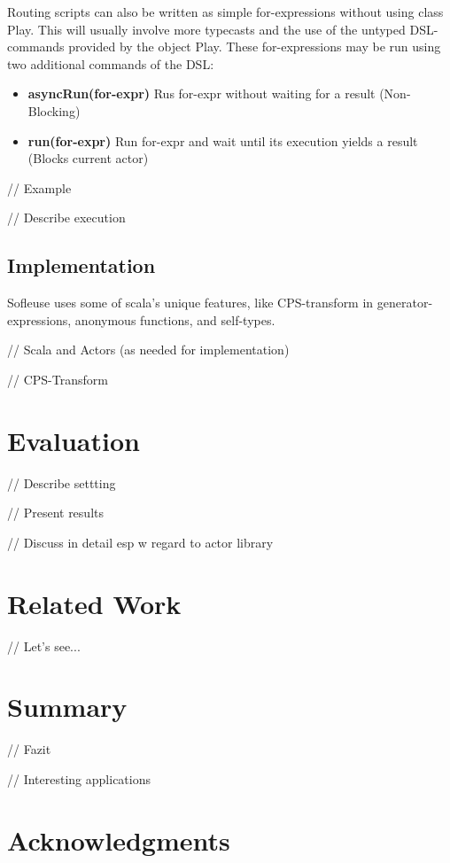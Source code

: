 \documentclass{sig-alternate}
\begin{document}
Routing scripts can also be written as simple for-expressions without using class Play.  This will
usually involve more typecasts and the use of the untyped DSL-commands provided by the object Play.
These for-expressions may be run using two additional commands of the DSL:

\begin{itemize}
	\item \textbf{asyncRun(for-expr)} Rus for-expr without waiting for a result (Non-Blocking)
    \item \textbf{run(for-expr)} Run for-expr and wait until its execution yields a result (Blocks current actor)
\end{itemize}	

// Example

// Describe execution

           
\subsection{Implementation}
                  
Sofleuse uses some of scala's unique features, like CPS-transform in generator-expressions,
anonymous functions, and self-types. 

// Scala and Actors (as needed for implementation)

// CPS-Transform 


\section{Evaluation}

// Describe settting

// Present results

// Discuss in detail esp w regard to actor library


\section{Related Work}

// Let's see...

\section{Summary}
                  
// Fazit

// Interesting applications

\section{Acknowledgments}


%  
\end{document}
